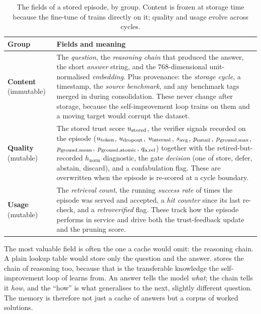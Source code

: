 \begin{table}[htbp]
\centering
\caption[Anatomy of an episode]{The fields of a stored episode, by group. Content
is frozen at storage time because the fine-tune of  trains directly
on it; quality and usage evolve across cycles.}
\label{tab:episode}
\small
\renewcommand{\arraystretch}{1.22}
\begin{tabularx}{\textwidth}{@{}l >{\raggedright\arraybackslash}X@{}}
\toprule
\textbf{Group} & \textbf{Fields and meaning} \\
\midrule
\textbf{Content} (immutable)
  & The \emph{question}, the \emph{reasoning chain} that produced the answer, the
    short \emph{answer} string, and the $768$-dimensional unit-normalised
    \emph{embedding}. Plus provenance: the \emph{storage cycle}, a timestamp, the
    \emph{source benchmark}, and any benchmark tags merged in during consolidation.
    These never change after storage, because the self-improvement loop trains on
    them and a moving target would corrupt the dataset. \\
\addlinespace[2pt]
\textbf{Quality} (mutable)
  & The stored trust score $u_{\text{stored}}$, the verifier signals recorded on the episode
    ($u_{\text{token}}$, $u_{\text{dropout}}$, $u_{\text{internal}}$, $s_{\text{avg}}$, $p_{\text{entail}}$, $p_{\text{ground,max}}$, $p_{\text{ground,mean}}$,
    $p_{\text{ground,atomic}}$, $q_{\text{a,rel}}$) together with the retired-but-recorded $h_{\text{norm}}$
    diagnostic, the gate
    \emph{decision} (one of store, defer, abstain, discard), and a confabulation
    flag. These are overwritten when the episode is re-scored at a cycle boundary. \\
\addlinespace[2pt]
\textbf{Usage} (mutable)
  & The \emph{retrieval count}, the running \emph{success rate} of times the episode
    was served and accepted, a \emph{hit counter} since its last re-check, and a
    \emph{retroverified} flag. These track how the episode performs in service and
    drive both the trust-feedback update and the pruning score. \\
\bottomrule
\end{tabularx}
\end{table}

\begin{intuition}
The most valuable field is often the one a cache would omit: the reasoning chain. A
plain lookup table would store only the question and the answer. \caem{} stores the
chain of reasoning too, because that is the transferable knowledge the
self-improvement loop of  learns from. An answer tells the model
\emph{what}; the chain tells it \emph{how}, and the ``how'' is what generalises to
the next, slightly different question. The memory is therefore not just a cache of
answers but a corpus of worked solutions.
\end{intuition}

